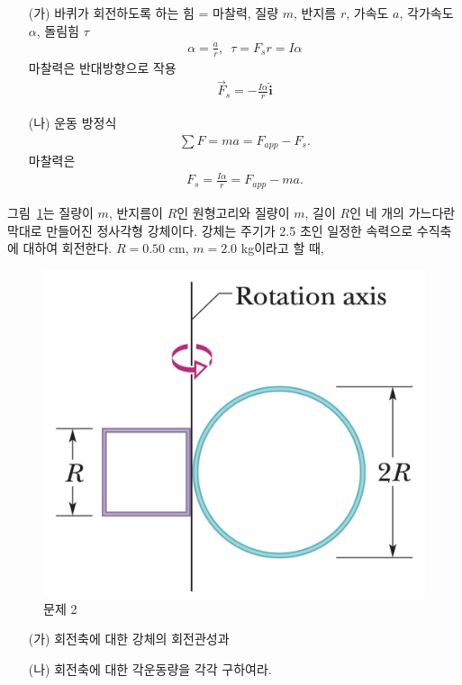 \documentclass[floatfix,nofootinbib,superscriptaddress,fleqn]{revtex4-2}
\begin{document}
\begin{itemize}
  \item[(가)] 바퀴가 회전하도록 하는 힘 = 마찰력, 질량 $m$, 반지름 $r$, 가속도 $a$,
  각가속도 $\alpha$, 돌림힘 $\tau$
  \begin{align}
    \alpha=\frac{a}{r},\,\,\, \tau = F_s r = I\alpha
  \end{align}
  마찰력은 반대방향으로 작용
  \begin{align}
    \vec{F}_s = -\frac{I\alpha}{r}\hat{\bm i}
  \end{align}
  \item[(나)]
  운동 방정식
  \begin{align}
    \sum F = ma = F_{app} - F_s.
  \end{align}
  마찰력은
  \begin{align}
    F_s=\frac{I\alpha}{r} = F_{app}-ma.
  \end{align}
\end{itemize}





\vspace{1.cm}


그림~\ref{fig:2}는 질량이 $m$, 반지름이 $R$인 원형고리와 질량이 $m$,
길이 $R$인 네 개의 가느다란 막대로 만들어진 정사각형 강체이다. 강체는
주기가 2.5 초인 일정한 속력으로 수직축에 대하여 회전한다. $R=0.50$ cm,
$m=2.0$ kg이라고 할 때,
\begin{figure}[ht]
  \centering
\includegraphics[scale=0.4]{Qfig14-2-20220427.png}
  \caption{문제 2}
  \label{fig:2}
\end{figure}
\begin{itemize}
\item[(가)] 회전축에 대한 강체의 회전관성과
\item[(나)] 회전축에 대한 각운동량을 각각 구하여라.   
\end{itemize}
\end{document}
